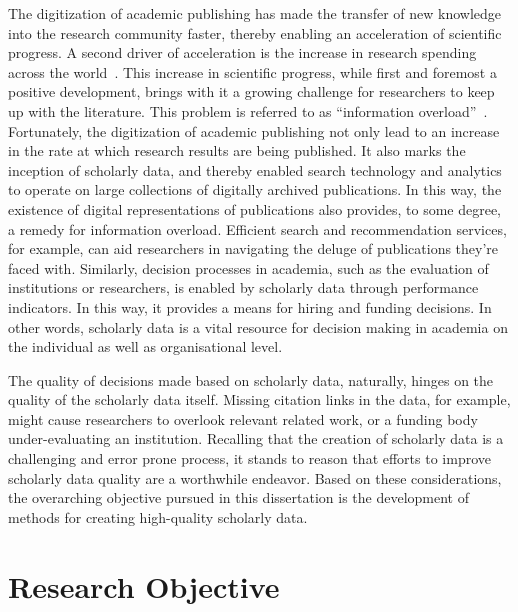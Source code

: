 The digitization of academic publishing has made the transfer of new knowledge into the research community faster, thereby enabling an acceleration of scientific progress. A second driver of acceleration is the increase in research spending across the world~\cite{CRS2022,OECD2023}.
This increase in scientific progress, while first and foremost a positive development, brings with it a growing challenge for researchers to keep up with the literature. This problem is referred to as ``information overload''~\cite{Landhuis2016}.
Fortunately, the digitization of academic publishing not only lead to %
an increase in the rate at which research results are being published. It also marks the inception of scholarly data, and thereby enabled search technology and analytics to operate on large collections of digitally archived publications.
In this way, the existence of digital representations of publications also provides, to some degree, a remedy for information overload. Efficient search and recommendation services, for example, can aid researchers in navigating the deluge of publications they're faced with.
Similarly, decision processes in academia, such as the evaluation of institutions or researchers, is enabled by scholarly data through performance indicators. In this way, it provides a means for hiring and funding decisions.
In other words, scholarly data is a vital resource for decision making in academia on the individual as well as organisational level.

The quality of decisions made based on scholarly data, naturally, hinges on the quality of the scholarly data itself. Missing citation links in the data, for example, might cause researchers to overlook relevant related work, or a funding body under-evaluating an institution. Recalling that the creation of scholarly data is a challenging and error prone process, it stands to reason that efforts to improve scholarly data quality are a worthwhile endeavor. Based on these considerations, the overarching objective pursued in this dissertation is the development of methods for creating high-quality scholarly data.


\section{Research Objective}\label{sec:intro-researchobj}

